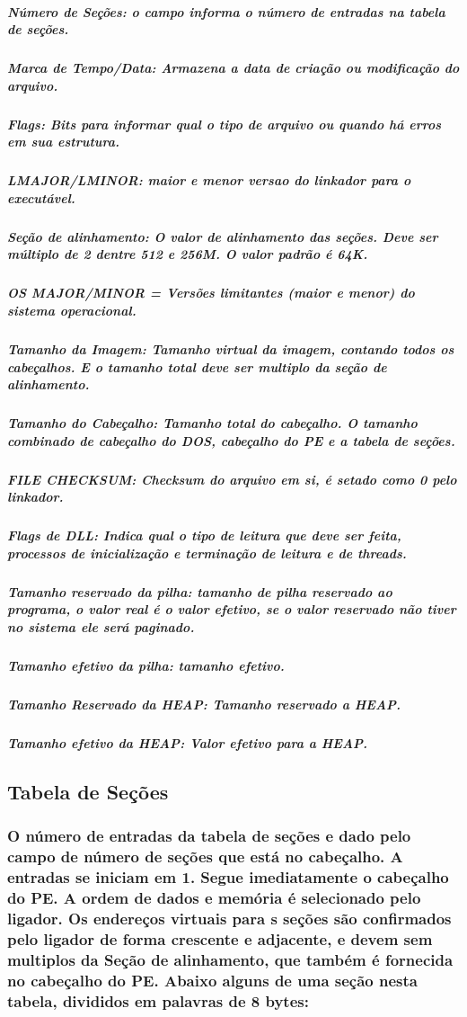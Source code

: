 \subparagraph{Número de Seções: o campo informa o número de entradas na tabela
de seções.}


\subparagraph{Marca de Tempo/Data: Armazena a data de criação ou modificação do
arquivo.}


\subparagraph{Flags: Bits para informar qual o tipo de arquivo ou quando há erros
em sua estrutura.}


\subparagraph{LMAJOR/LMINOR: maior e menor versao do linkador para o executável.}


\subparagraph{Seção de alinhamento: O valor de alinhamento das seções. Deve ser
múltiplo de 2 dentre 512 e 256M. O valor padrão é 64K.}


\subparagraph{OS MAJOR/MINOR = Versões limitantes (maior e menor) do sistema operacional.}


\subparagraph{Tamanho da Imagem: Tamanho virtual da imagem, contando todos os cabeçalhos.
E o tamanho total deve ser multiplo da seção de alinhamento.}


\subparagraph{Tamanho do Cabeçalho: Tamanho total do cabeçalho. O tamanho combinado
de cabeçalho do DOS, cabeçalho do PE e a tabela de seções.}


\subparagraph{FILE CHECKSUM: Checksum do arquivo em si, é setado como 0 pelo linkador.}


\subparagraph{Flags de DLL: Indica qual o tipo de leitura que deve ser feita, processos
de inicialização e terminação de leitura e de threads.}


\subparagraph{Tamanho reservado da pilha: tamanho de pilha reservado ao programa,
o valor real é o valor efetivo, se o valor reservado não tiver no
sistema ele será paginado.}


\subparagraph{Tamanho efetivo da pilha: tamanho efetivo.}


\subparagraph{Tamanho Reservado da HEAP: Tamanho reservado a HEAP.}


\subparagraph{Tamanho efetivo da HEAP: Valor efetivo para a HEAP.}


\subsection{Tabela de Seções}


\subsubsection*{O número de entradas da tabela de seções e dado pelo campo de número
de seções que está no cabeçalho. A entradas se iniciam em 1. Segue
imediatamente o cabeçalho do PE. A ordem de dados e memória é selecionado
pelo ligador. Os endereços virtuais para s seções são confirmados
pelo ligador de forma crescente e adjacente, e devem sem multiplos
da Seção de alinhamento, que também é fornecida no cabeçalho do PE.
Abaixo alguns de uma seção nesta tabela, divididos em palavras de
8 bytes:}


